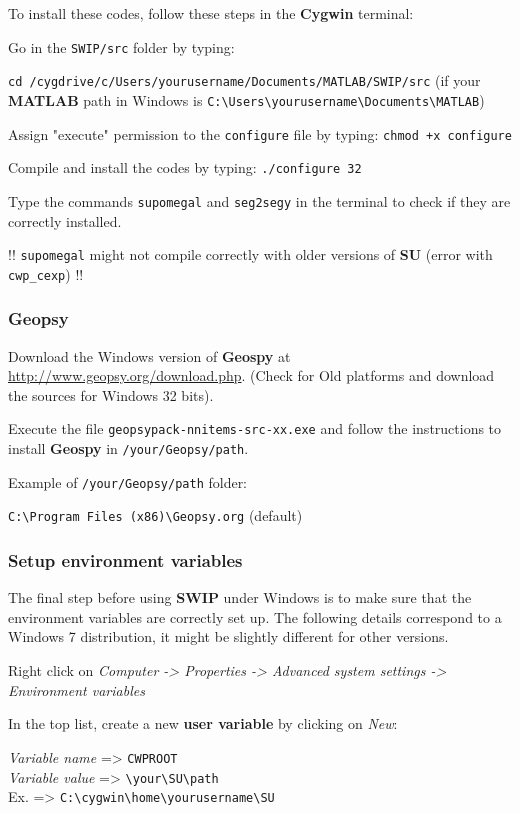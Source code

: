 \documentclass[twoside,a4paper]{article}
\def\SWIP{\textbf{SWIP}}
\def\SU{\textbf{SU}}
\def\Geopsy{\textbf{Geospy}}
\def\MATLAB{\textbf{MATLAB}}
\def\Cygwin{\textbf{Cygwin}}
\begin{document}
To install these codes, follow these steps in the {\Cygwin} terminal:

Go in the \verb|SWIP/src| folder by typing: 

\verb|cd /cygdrive/c/Users/yourusername/Documents/MATLAB/SWIP/src| (if your {\MATLAB} path in Windows is \verb|C:\Users\yourusername\Documents\MATLAB|)

Assign "execute" permission to the \verb|configure| file by typing: \verb|chmod +x configure|

Compile and install the codes by typing: \verb|./configure 32|

Type the commands \verb|supomegal| and \verb|seg2segy| in the terminal to check if they are correctly installed.

!! \verb|supomegal| might not compile correctly with older versions of {\SU} (error with \verb|cwp_cexp|) !!

\subsubsection{Geopsy}
Download the Windows version of {\Geopsy} at \url{http://www.geopsy.org/download.php}.
(Check for Old platforms and download the sources for Windows 32 bits).

Execute the file \verb|geopsypack-nnitems-src-xx.exe| and follow the instructions to install {\Geopsy} in \verb|/your/Geopsy/path|.

Example of \verb|/your/Geopsy/path| folder:

\verb|C:\Program Files (x86)\Geopsy.org| (default)

\subsubsection{Setup environment variables}
The final step before using {\SWIP} under Windows is to make sure that the environment variables are correctly set up. The following details correspond to a Windows 7 distribution, it might be slightly different for other versions.

Right click on \textit{Computer -> Properties -> Advanced system settings -> Environment variables}

In the top list, create a new \textbf{user variable} by clicking on \textit{New}:

\textit{Variable name} => \verb|CWPROOT|\\
\textit{Variable value} => \verb|\your\SU\path|\\
Ex. => \verb|C:\cygwin\home\yourusername\SU|
\end{document}
